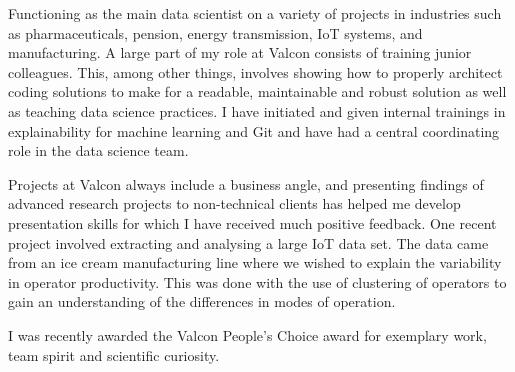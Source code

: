 Functioning as the main data scientist on a variety of projects in industries such as pharmaceuticals, pension, energy transmission, IoT systems, and manufacturing.
A large part of my role at Valcon consists of training junior colleagues.
This, among other things, involves showing how to properly architect coding solutions to make for a readable, maintainable and robust solution as well as teaching data science practices.
I have initiated and given internal trainings in explainability for machine learning and Git and have had a central coordinating role in the data science team.

Projects at Valcon always include a business angle, and presenting findings of advanced research projects to non-technical clients has helped me develop presentation skills for which I have received much positive feedback.
One recent project involved extracting and analysing a large IoT data set.
The data came from an ice cream manufacturing line where we wished to explain the variability in operator productivity.
This was done with the use of clustering of operators to gain an understanding of the differences in modes of operation.

I was recently awarded the Valcon People's Choice award for exemplary work, team spirit and scientific curiosity.